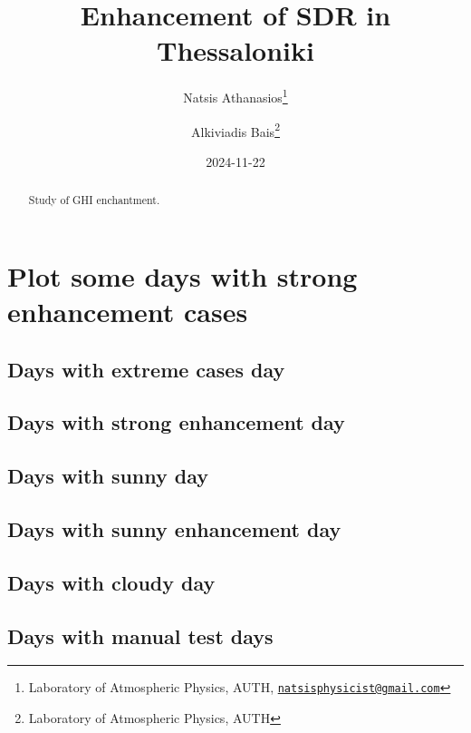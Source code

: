 \documentclass[
  10pt,
  a4paper,oneside]{article}
\title{Enhancement of SDR in Thessaloniki}
\author{Natsis Athanasios\footnote{Laboratory of Atmospheric Physics, AUTH, \href{mailto:natsisphysicist@gmail.com}{\nolinkurl{natsisphysicist@gmail.com}}} \and Alkiviadis Bais\footnote{Laboratory of Atmospheric Physics, AUTH}}
\date{2024-11-22}
\begin{document}
\maketitle
\begin{abstract}
Study of GHI enchantment.
\end{abstract}

{
\hypersetup{linkcolor=}
\setcounter{tocdepth}{4}
\tableofcontents
}
\FloatBarrier

\section{Plot some days with strong enhancement cases}\label{plot-some-days-with-strong-enhancement-cases}

\FloatBarrier

\subsection{Days with extreme cases day}\label{days-with-extreme-cases-day}

\FloatBarrier

\subsection{Days with strong enhancement day}\label{days-with-strong-enhancement-day}

\FloatBarrier

\subsection{Days with sunny day}\label{days-with-sunny-day}

\FloatBarrier

\subsection{Days with sunny enhancement day}\label{days-with-sunny-enhancement-day}

\FloatBarrier

\subsection{Days with cloudy day}\label{days-with-cloudy-day}

\FloatBarrier

\subsection{Days with manual test days}\label{days-with-manual-test-days}
\end{document}
